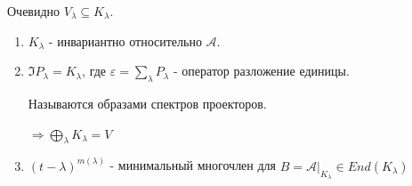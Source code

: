 Очевидно $V_{\lambda}\subseteq K_{\lambda}$.

\begin{enumerate}
    \item $K_{\lambda}$ - инвариантно относительно $\mathcal{A}$.
    \item $\Im P_{\lambda} = K_{\lambda}$, где $\varepsilon = \sum\limits_{\lambda}P_{\lambda}$ - оператор разложение единицы. 

    Называются образами спектров проекторов.

    $\Rightarrow \bigoplus\limits_{\lambda} K_{\lambda} = V$

    \item $(t-\lambda)^{m(\lambda)}$ - минимальный многочлен для $B = \mathcal{A}\Big|_{K_{\lambda}}\in End(K_{\lambda})$
\end{enumerate}

